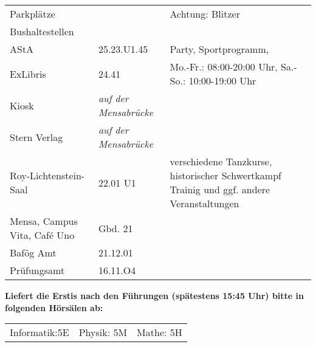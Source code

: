 \documentclass[a4paper,10pt]{article}
\begin{document}
\begin{tabularx}{\textwidth}{p{}p{}p{}}
 Parkplätze & & Achtung: Blitzer \\
 Bushaltestellen & & \\
 AStA & 25.23.U1.45 & Party, Sportprogramm, \\
 ExLibris & 24.41 & Mo.-Fr.: 08:00-20:00 Uhr, Sa.-So.: 10:00-19:00 Uhr \\
 Kiosk &  \textit{auf der Mensabrücke} & \\
 Stern Verlag & \textit{auf der Mensabrücke} & \\
 Roy-Lichtenstein-Saal & 22.01 U1 & verschiedene Tanzkurse, historischer Schwertkampf Trainig und ggf. andere Veranstaltungen \\
 Mensa, Campus Vita, Café Uno & Gbd. 21 & \\
 Bafög Amt & 21.12.01 & \\
 Prüfungsamt & 16.11.O4 &
\end{tabularx}
\vspace{5mm}

\textbf{Liefert die Erstis nach den Führungen (spätestens 15:45 Uhr) bitte in folgenden Hörsälen ab:}\\ \vspace{\baselineskip}
\hspace{-4mm}
\begin{tabularx}{\textwidth}{p{}p{}p{}}
Informatik:5E & Physik: 5M & Mathe: 5H
\end{tabularx}
\end{document}
